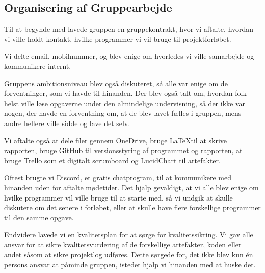 \subsection{Organisering af Gruppearbejde}

Til at begynde med lavede gruppen en gruppekontrakt, hvor vi aftalte, hvordan vi ville holdt kontakt, hvilke programmer vi vil bruge til projektforløbet.

Vi delte email, mobilnummer, og blev enige om hvorledes vi ville samarbejde og kommunikere internt.

Gruppens ambitionsniveau blev også diskuteret, så alle var enige om de forventninger, som vi havde til hinanden.
Der blev også talt om, hvordan folk helst ville løse opgaverne under den almindelige undervisning, så der ikke var nogen, der havde en forventning om, at de blev lavet fælles i gruppen, mens andre hellere ville sidde og lave det selv.

Vi aftalte også at dele filer gennem OneDrive, bruge \LaTeX til at skrive rapporten, bruge GitHub til versionsstyring af programmet og rapporten, at bruge Trello som et digitalt scrumboard og LucidChart til artefakter.

Oftest brugte vi Discord, et gratis chatprogram, til at kommunikere med hinanden uden for aftalte mødetider.
Det hjalp gevaldigt, at vi alle blev enige om hvilke programmer vil ville bruge til at starte med, så vi undgik at skulle diskutere om det senere i forløbet, eller at skulle have flere forskellige programmer til den samme opgave.

Endvidere lavede vi en kvalitetsplan for at sørge for kvalitetssikring.
Vi gav alle ansvar for at sikre kvalitetsvurdering af de forskellige artefakter, koden eller andet såsom at sikre projektlog udføres.
Dette sørgede for, det ikke blev kun én persons ansvar at påminde gruppen, istedet hjalp vi hinanden med at huske det.


